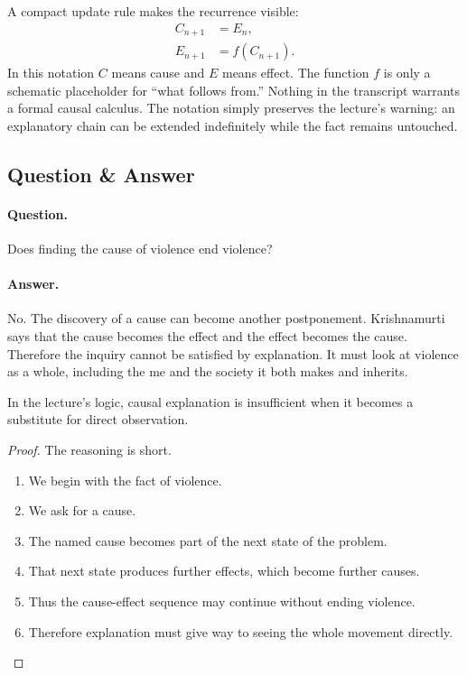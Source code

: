 A compact update rule makes the recurrence visible:
\begin{align}
C_{n+1} &= E_n,\\
E_{n+1} &= f(C_{n+1}).
\end{align}
In this notation \(C\) means cause and \(E\) means effect. The function \(f\) is only a schematic placeholder for ``what follows from.'' Nothing in the transcript warrants a formal causal calculus. The notation simply preserves the lecture's warning: an explanatory chain can be extended indefinitely while the fact remains untouched.

\subsection{Question \& Answer}

\paragraph{Question.}
Does finding the cause of violence end violence?

\paragraph{Answer.}
No. The discovery of a cause can become another postponement. Krishnamurti says that the cause becomes the effect and the effect becomes the cause. Therefore the inquiry cannot be satisfied by explanation. It must look at violence as a whole, including the me and the society it both makes and inherits.

\begin{proposition}
In the lecture's logic, causal explanation is insufficient when it becomes a substitute for direct observation.
\end{proposition}

\begin{proof}
The reasoning is short.
\begin{enumerate}
\item We begin with the fact of violence.
\item We ask for a cause.
\item The named cause becomes part of the next state of the problem.
\item That next state produces further effects, which become further causes.
\item Thus the cause-effect sequence may continue without ending violence.
\item Therefore explanation must give way to seeing the whole movement directly.
\end{enumerate}
\end{proof}

